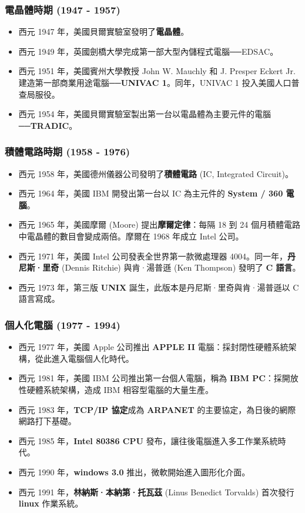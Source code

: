 \documentclass[12pt,a4paper,oneside]{report}
\begin{document}
\begin{CJK}{UTF8}{bkai}
\subsubsection{電晶體時期 (1947 - 1957)}
\begin{itemize}
\item 西元 1947 年，美國貝爾實驗室發明了\textbf{電晶體}。
\item 西元 1949 年，英國劍橋大學完成第一部大型內儲程式電腦──EDSAC。
\item 西元 1951 年，美國賓州大學教授 John W. Mauchly 和 J. Presper Eckert Jr. 建造第一部商業用途電腦──\textbf{UNIVAC 1}。同年，UNIVAC 1 投入美國人口普查局服役。
\item 西元 1954 年，美國貝爾實驗室製出第一台以電晶體為主要元件的電腦──\textbf{TRADIC}。
\end{itemize}

\subsubsection{積體電路時期 (1958 - 1976)}
\begin{itemize}
\item 西元 1958 年，美國德州儀器公司發明了\textbf{積體電路} (IC, Integrated Circuit)。
\item 西元 1964 年，美國 IBM 開發出第一台以 IC 為主元件的 \textbf{System / 360 電腦}。
\item 西元 1965 年，美國摩爾 (Moore) 提出\textbf{摩爾定律}：每隔 18 到 24 個月積體電路中電晶體的數目會變成兩倍。摩爾在 1968 年成立 Intel 公司。
\item 西元 1971 年，美國 Intel 公司發表全世界第一款微處理器 4004。同一年，\textbf{丹尼斯·里奇} (Dennis Ritchie) 與肯·湯普遜 (Ken Thompson) 發明了 \textbf{C 語言}。
\item 西元 1973 年，第三版 \textbf{UNIX} 誕生，此版本是丹尼斯·里奇與肯·湯普遜以 C 語言寫成。
\end{itemize}

\subsubsection{個人化電腦 (1977 - 1994)}
\begin{itemize}
\item 西元 1977 年，美國 Apple 公司推出 \textbf{APPLE II} 電腦：採封閉性硬體系統架構，從此進入電腦個人化時代。
\item 西元 1981 年，美國 IBM 公司推出第一台個人電腦，稱為 \textbf{IBM PC}：採開放性硬體系統架構，造成 IBM 相容型電腦的大量生產。
\item 西元 1983 年，\textbf{TCP/IP 協定}成為 \textbf{ARPANET} 的主要協定，為日後的網際網路打下基礎。
\item 西元 1985 年，\textbf{Intel 80386 CPU} 發布，讓往後電腦進入多工作業系統時代。
\item 西元 1990 年，\textbf{windows 3.0} 推出，微軟開始進入圖形化介面。
\item 西元 1991 年，\textbf{林納斯·本納第·托瓦茲} (Linus Benedict Torvalds) 首次發行 \textbf{linux} 作業系統。
\end{itemize}


\end{CJK}
\end{document}
